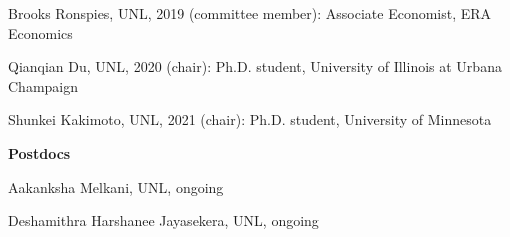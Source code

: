 \documentclass[10pt,margin,line]{res}
\newenvironment{list1}{
  \begin{list}{\ding{113}}{%
      \setlength{\itemsep}{0in}
      \setlength{\parsep}{0in} \setlength{\parskip}{0in}
      \setlength{\topsep}{0in} \setlength{\partopsep}{0in}
      \setlength{\leftmargin}{0.17in}}}{\end{list}}
\newenvironment{list2}{
  \begin{list}{-}{%
      \setlength{\itemsep}{0in}
      \setlength{\parsep}{0in} \setlength{\parskip}{0in}
      \setlength{\topsep}{0in} \setlength{\partopsep}{0in}
      \setlength{\leftmargin}{0.2in}}}{\end{list}}
\begin{document}
\begin{resume}
\begin{list1}
\begin{list2}
    \item Brooks Ronspies, UNL, 2019 (committee member): Associate Economist, ERA Economics
    \item Qianqian Du, UNL, 2020 (chair): Ph.D. student, University of Illinois at Urbana Champaign
    \item Shunkei Kakimoto, UNL, 2021 (chair): Ph.D. student, University of Minnesota
  \end{list2}
  \item[] \textbf{Postdocs}
  \begin{list2}
    \item Aakanksha Melkani, UNL, ongoing
    \item Deshamithra Harshanee Jayasekera, UNL, ongoing
  \end{list2}
\end{list1}
\end{resume}
\end{document}
